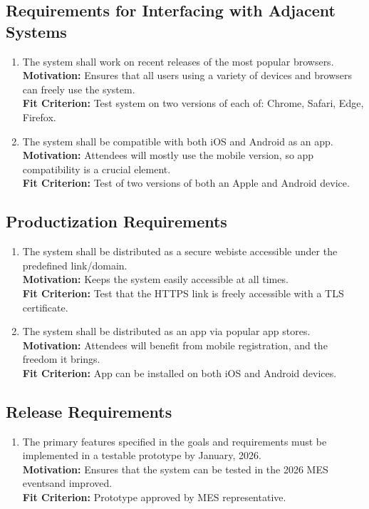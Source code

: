 \documentclass[12pt]{article}
\begin{document}
\subsection{Requirements for Interfacing with Adjacent Systems}
\begin{enumerate}[label=\bfseries IR-\arabic*:, wide=0pt, leftmargin=*]
  \item The system shall work on recent releases of the most popular browsers.\\
    {\bf Motivation:} Ensures that all users using a variety of devices and browsers can freely use the system.\\
    {\bf Fit Criterion:} Test system on two versions of each of: Chrome, Safari, Edge, Firefox.
  \item The system shall be compatible with both iOS and Android as an app.\\
    {\bf Motivation:} Attendees will mostly use the mobile version, so app compatibility is a crucial element.\\
    {\bf Fit Criterion:} Test of two versions of both an Apple and Android device. 
\end{enumerate}

\subsection{Productization Requirements}
\begin{enumerate}[label=\bfseries PD-\arabic*:, wide=0pt, leftmargin=*]
  \item The system shall be distributed as a secure webiste accessible under the predefined link/domain.\\
    {\bf Motivation:} Keeps the system easily accessible at all times.\\
    {\bf Fit Criterion:} Test that the HTTPS link is freely accessible with a TLS certificate.
  \item The system shall be distributed as an app via popular app stores.\\
    {\bf Motivation:} Attendees will benefit from mobile registration, and the freedom it brings.\\
    {\bf Fit Criterion:} App can be installed on both iOS and Android devices.
\end{enumerate}

\subsection{Release Requirements}
\begin{enumerate}[label=\bfseries RR-\arabic*:, wide=0pt, leftmargin=*]
  \item The primary features specified in the goals and requirements must be implemented in a testable prototype by January, 2026.\\
    {\bf Motivation:} Ensures that the system can be tested in the 2026 MES eventsand improved.\\
    {\bf Fit Criterion:} Prototype approved by MES representative.
\end{enumerate}
\end{document}
